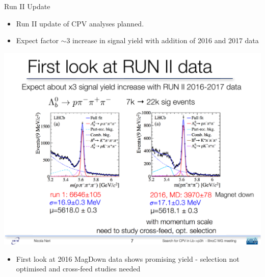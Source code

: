\documentclass{beamer}
\begin{document}
\begin{frame}{Run II Update}
  \begin{itemize}
  \item Run II update of CPV analyses planned.
  \item Expect factor $\sim3$ increase in signal yield with addition of 2016 and 2017 data
  \end{itemize}
  \begin{center}
    \includegraphics[width=.8\textwidth]{Run2FirstLook.pdf}
  \end{center}
  \begin{itemize}
  \item First look at 2016 MagDown data shows promising yield - selection not optimised and cross-feed studies needed
  \end{itemize}
\end{frame}
\end{document}
